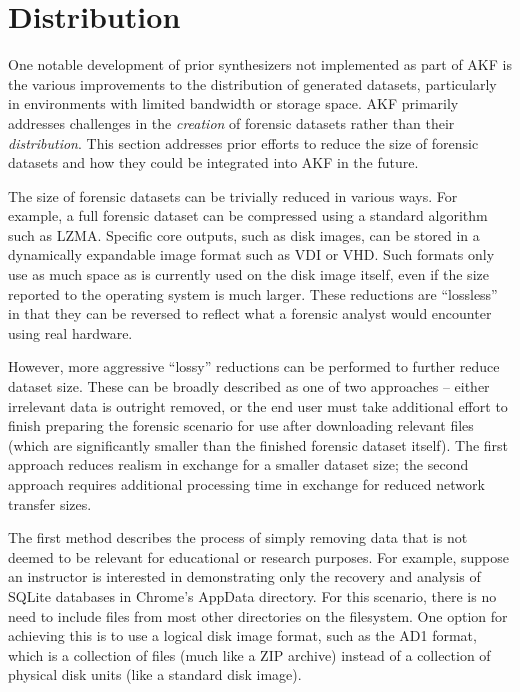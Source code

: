 \section{Distribution}\label{distribution}

One notable development of prior synthesizers not implemented as part of
AKF is the various improvements to the distribution of generated
datasets, particularly in environments with limited bandwidth or storage
space. AKF primarily addresses challenges in the \emph{creation} of
forensic datasets rather than their \emph{distribution}. This section
addresses prior efforts to reduce the size of forensic datasets and how
they could be integrated into AKF in the future.

The size of forensic datasets can be trivially reduced in various ways.
For example, a full forensic dataset can be compressed using a standard
algorithm such as LZMA. Specific core outputs, such as disk images, can
be stored in a dynamically expandable image format such as VDI or VHD.
Such formats only use as much space as is currently used on the disk
image itself, even if the size reported to the operating system is much
larger. These reductions are ``lossless'' in that they can be reversed
to reflect what a forensic analyst would encounter using real hardware.

However, more aggressive ``lossy'' reductions can be performed to
further reduce dataset size. These can be broadly described as one of
two approaches -- either irrelevant data is outright removed, or the end
user must take additional effort to finish preparing the forensic
scenario for use after downloading relevant files (which are
significantly smaller than the finished forensic dataset itself). The
first approach reduces realism in exchange for a smaller dataset size;
the second approach requires additional processing time in exchange for
reduced network transfer sizes.

The first method describes the process of simply removing data that is
not deemed to be relevant for educational or research purposes. For
example, suppose an instructor is interested in demonstrating only the
recovery and analysis of SQLite databases in Chrome's AppData directory.
For this scenario, there is no need to include files from most other
directories on the filesystem. One option for achieving this is to use a
logical disk image format, such as the AD1 format, which is a collection
of files (much like a ZIP archive) instead of a collection of physical
disk units (like a standard disk image).

